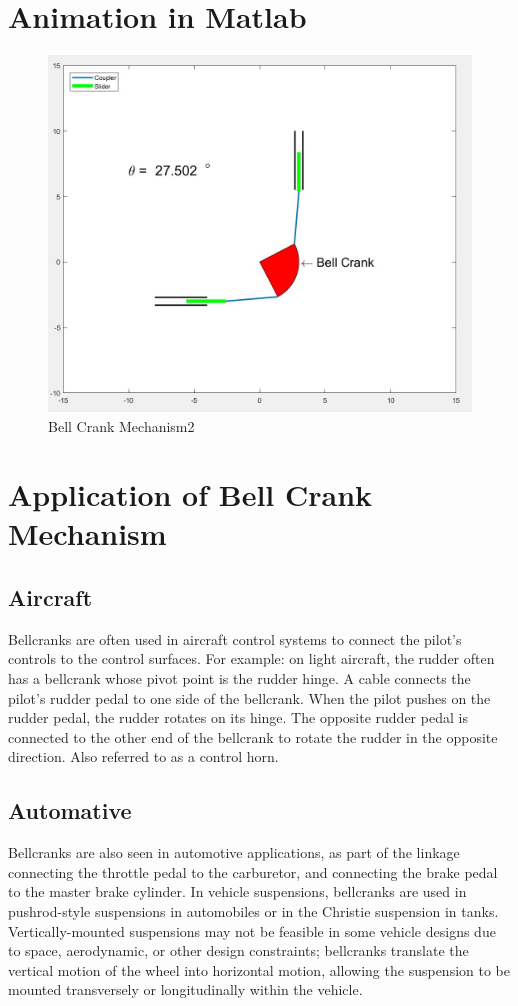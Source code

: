\documentclass[12pt,a4paper]{article}
\begin{document}
	\section{Animation in Matlab}
	\begin{figure}[H]
		\label{fig1}
		\centering
		\includegraphics[scale=0.5]{crank}
		\caption{Bell Crank Mechanism2}
	\end{figure}
	\section{Application of Bell Crank Mechanism}
	\subsection{Aircraft}
	Bellcranks are often used in aircraft control systems to connect the pilot's controls to the control surfaces. For example: on light aircraft, the rudder often has a bellcrank whose pivot point is the rudder hinge. A cable connects the pilot's rudder pedal to one side of the bellcrank. When the pilot pushes on the rudder pedal, the rudder rotates on its hinge. The opposite rudder pedal is connected to the other end of the bellcrank to rotate the rudder in the opposite direction. Also referred to as a control horn.
	
	\subsection{Automative}
	Bellcranks are also seen in automotive applications, as part of the linkage connecting the throttle pedal to the carburetor, and connecting the brake pedal to the master brake cylinder. In vehicle suspensions, bellcranks are used in pushrod-style suspensions in automobiles or in the Christie suspension in tanks. Vertically-mounted suspensions may not be feasible in some vehicle designs due to space, aerodynamic, or other design constraints; bellcranks translate the vertical motion of the wheel into horizontal motion, allowing the suspension to be mounted transversely or longitudinally within the vehicle.
\end{document}
